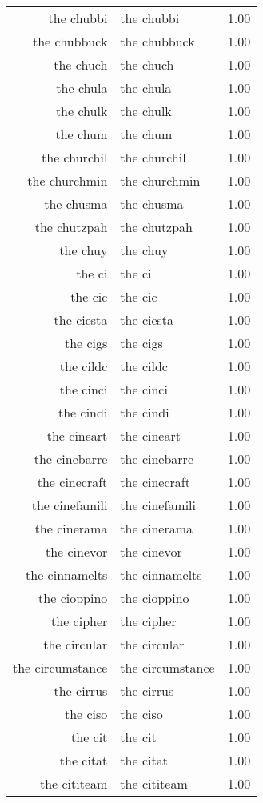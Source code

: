\begin{table}[ht]
\begin{tabular}{rlr}
  the chubbi & the chubbi & 1.00 \\ 
  the chubbuck & the chubbuck & 1.00 \\ 
  the chuch & the chuch & 1.00 \\ 
  the chula & the chula & 1.00 \\ 
  the chulk & the chulk & 1.00 \\ 
  the chum & the chum & 1.00 \\ 
  the churchil & the churchil & 1.00 \\ 
  the churchmin & the churchmin & 1.00 \\ 
  the chusma & the chusma & 1.00 \\ 
  the chutzpah & the chutzpah & 1.00 \\ 
  the chuy & the chuy & 1.00 \\ 
  the ci & the ci & 1.00 \\ 
  the cic & the cic & 1.00 \\ 
  the ciesta & the ciesta & 1.00 \\ 
  the cigs & the cigs & 1.00 \\ 
  the cildc & the cildc & 1.00 \\ 
  the cinci & the cinci & 1.00 \\ 
  the cindi & the cindi & 1.00 \\ 
  the cineart & the cineart & 1.00 \\ 
  the cinebarre & the cinebarre & 1.00 \\ 
  the cinecraft & the cinecraft & 1.00 \\ 
  the cinefamili & the cinefamili & 1.00 \\ 
  the cinerama & the cinerama & 1.00 \\ 
  the cinevor & the cinevor & 1.00 \\ 
  the cinnamelts & the cinnamelts & 1.00 \\ 
  the cioppino & the cioppino & 1.00 \\ 
  the cipher & the cipher & 1.00 \\ 
  the circular & the circular & 1.00 \\ 
  the circumstance & the circumstance & 1.00 \\ 
  the cirrus & the cirrus & 1.00 \\ 
  the ciso & the ciso & 1.00 \\ 
  the cit & the cit & 1.00 \\ 
  the citat & the citat & 1.00 \\ 
  the cititeam & the cititeam & 1.00 \\ 

\end{tabular}
\end{table}
